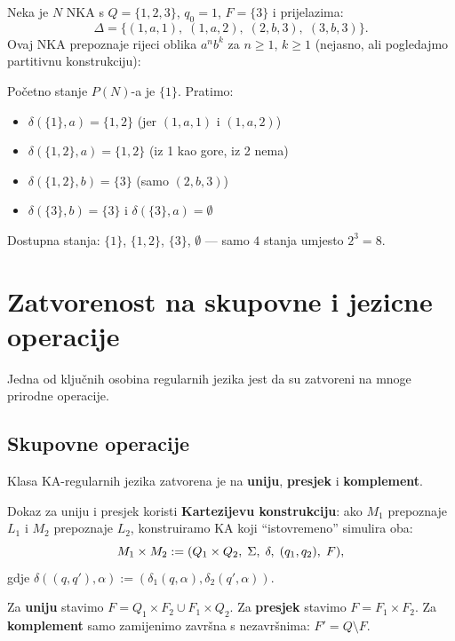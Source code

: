 \begin{primjer}
Neka je $N$ NKA s $Q = \{1, 2, 3\}$, $q_0 = 1$, $F = \{3\}$ i
prijelazima:
\[
  \Delta = \{(1,a,1),\; (1,a,2),\; (2,b,3),\; (3,b,3)\}.
\]
Ovaj NKA prepoznaje rijeci oblika $a^n b^k$ za $n \geq 1$, $k \geq 1$
(nejasno, ali pogledajmo partitivnu konstrukciju):

Početno stanje $P(N)$-a je $\{1\}$. Pratimo:
\begin{itemize}
  \item $\delta(\{1\}, a) = \{1, 2\}$ (jer $(1,a,1)$ i $(1,a,2)$)
  \item $\delta(\{1,2\}, a) = \{1, 2\}$ (iz 1 kao gore, iz 2 nema)
  \item $\delta(\{1,2\}, b) = \{3\}$ (samo $(2,b,3)$)
  \item $\delta(\{3\}, b) = \{3\}$ i $\delta(\{3\}, a) = \emptyset$
\end{itemize}
Dostupna stanja: $\{1\}$, $\{1,2\}$, $\{3\}$, $\emptyset$ ---
samo $4$ stanja umjesto $2^3 = 8$.
\end{primjer}

\section{Zatvorenost na skupovne i jezicne operacije}

Jedna od ključnih osobina regularnih jezika jest da su zatvoreni na
mnoge prirodne operacije.

\subsection{Skupovne operacije}

\begin{propozicija}
Klasa KA-regularnih jezika zatvorena je na \textbf{uniju}, \textbf{presjek}
i \textbf{komplement}.
\end{propozicija}

Dokaz za uniju i presjek koristi \textbf{Kartezijevu konstrukciju}:
ako $M_1$ prepoznaje $L_1$ i $M_2$ prepoznaje $L_2$, konstruiramo
KA koji ``istovremeno'' simulira oba:
\[
  M_1 \times M_2 := (Q_1 \times Q_2,\; \Sigma,\; \delta,\; (q_1, q_2),\; F),
\]
gdje $\delta((q,q'), \alpha) := (\delta_1(q,\alpha), \delta_2(q',\alpha))$.

Za \textbf{uniju} stavimo $F = Q_1 \times F_2 \cup F_1 \times Q_2$.
Za \textbf{presjek} stavimo $F = F_1 \times F_2$.
Za \textbf{komplement} samo zamijenimo završna s nezavršnima: $F' = Q \setminus F$.

